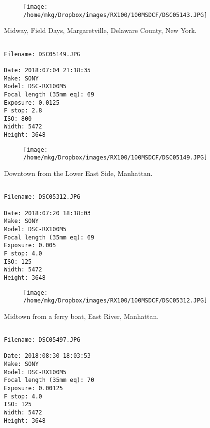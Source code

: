 \begin{figure}
\texttt{[image: /home/mkg/Dropbox/images/RX100/100MSDCF/DSC05143.JPG]}
\end{figure}
    
\clearpage
\onecolumn
\noindent Midway, Field Days, Margaretville, Delaware County, New York.
\noindent
\begin{lstlisting}

Filename: DSC05149.JPG

Date: 2018:07:04 21:18:35
Make: SONY
Model: DSC-RX100M5
Focal length (35mm eq): 69
Exposure: 0.0125
F stop: 2.8
ISO: 800
Width: 5472
Height: 3648
\end{lstlisting}
\clearpage

\begin{figure}
\texttt{[image: /home/mkg/Dropbox/images/RX100/100MSDCF/DSC05149.JPG]}
\end{figure}
    
\clearpage
\onecolumn
\noindent Downtown from the Lower East Side, Manhattan.
\noindent
\begin{lstlisting}

Filename: DSC05312.JPG

Date: 2018:07:20 18:18:03
Make: SONY
Model: DSC-RX100M5
Focal length (35mm eq): 69
Exposure: 0.005
F stop: 4.0
ISO: 125
Width: 5472
Height: 3648
\end{lstlisting}
\clearpage

\begin{figure}
\texttt{[image: /home/mkg/Dropbox/images/RX100/100MSDCF/DSC05312.JPG]}
\end{figure}
    
\clearpage
\onecolumn
\noindent Midtown from a ferry boat, East River, Manhattan.
\noindent
\begin{lstlisting}

Filename: DSC05497.JPG

Date: 2018:08:30 18:03:53
Make: SONY
Model: DSC-RX100M5
Focal length (35mm eq): 70
Exposure: 0.00125
F stop: 4.0
ISO: 125
Width: 5472
Height: 3648
\end{lstlisting}
\clearpage

